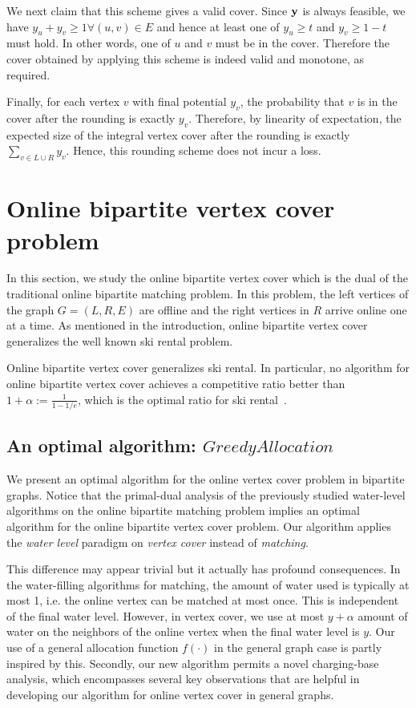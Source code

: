 \documentclass{article}
\newcommand{\by}{{\bf{y}}}
\begin{document}
We next claim that this scheme gives a valid cover. Since $\by$ is always feasible, we have $y_u+y_v\geq 1\forall (u,v)\in E$ and hence at least one of $y_u\geq t$ and $y_v\geq 1-t$ must hold. In other words, one of $u$ and $v$ must be in the cover.
Therefore the cover obtained by applying this scheme is indeed valid and monotone, as required.

Finally, for each vertex $v$ with final potential $y_v$, the probability that $v$ is in the cover after the rounding is exactly $y_v$. Therefore, by linearity of expectation, the expected size of the integral vertex cover after the rounding is exactly $\sum_{v\in L\cup R} y_v$. Hence, this rounding scheme does not incur a loss.

\section{Online bipartite vertex cover problem}

In this section, we study the online bipartite vertex cover which is the dual of the traditional online bipartite matching problem. In this problem, the left vertices of the graph $G=(L,R,E)$ are offline and the right vertices in $R$ arrive online one at a time.
As mentioned in the introduction, online bipartite vertex cover generalizes the well known ski rental problem.
\begin{lemma}
Online bipartite vertex cover generalizes ski rental. In particular, no algorithm for online bipartite vertex cover achieves a competitive ratio better than $1+\alpha:=\frac{1}{1-1/e}$, which is the optimal ratio for ski rental~\cite{Karlin1994}.
\end{lemma}

\subsection{An optimal algorithm: $GreedyAllocation$}
\label{subsec:greedyallocation}
We present an optimal algorithm for the online vertex cover problem in bipartite graphs.  Notice that the primal-dual analysis of the previously studied water-level algorithms on the online bipartite matching problem implies an optimal algorithm for the online bipartite vertex cover problem. Our algorithm applies the {\em water level} paradigm on {\em vertex cover} instead of {\em matching}. 

This difference may appear trivial but it actually has profound consequences. In the water-filling algorithms for matching, the amount of water used is typically at most 1, i.e. the online vertex can be matched at most once. This is independent of the final water level. However, in vertex cover, we use at most $y+\alpha$ amount of water on the neighbors of the online vertex when the final water level is $y$. Our use of a general allocation function $f(\cdot)$ in the general graph case is partly inspired by this. Secondly, our new algorithm permits a novel charging-base analysis, 
which encompasses several key observations that are helpful in developing our algorithm for online vertex cover in general graphs.
\end{document}
